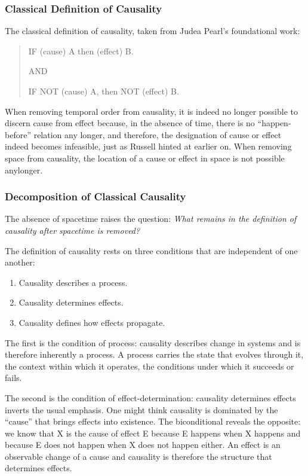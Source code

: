 \subsubsection{Classical Definition of Causality}


The classical definition of causality, taken from Judea Pearl's foundational work\cite{pearl2000causality}: 

\begin{quote}
    IF (cause) A then (effect) B.
    
    AND 
    
    IF NOT (cause) A, then NOT (effect) B.
\end{quote}

When removing temporal order from causality, it is indeed no longer possible to discern cause from effect because, in the absence of time, there is no “happen-before” relation any longer, and therefore, the designation of cause or effect indeed becomes infeasible, just as Russell hinted at earlier on. When removing space from causality, the location of a cause or effect in space is not possible anylonger. 
  
  
  
\subsubsection{Decomposition of Classical Causality}
\label{sec:epp_decomposition}


The absence of spacetime raises the question: \emph{What remains in the definition of causality after spacetime is removed?}

The definition of causality rests on three conditions that are independent of one another:

\begin{enumerate}
    \item Causality describes a process.
    \item Causality determines effects.
    \item Causality defines how effects propagate.
\end{enumerate}


 The first is the condition of process: causality describes change in systems and is therefore inherently a process. A process carries the state that evolves through it, the context within which it operates, the conditions under which it succeeds or fails.
 
 The second is the condition of effect-determination: causality determines effects inverts the usual emphasis. One might think causality is dominated by the ``cause'' that brings effects into existence. The biconditional reveals the opposite: we know that X is the cause of effect E because E happens when X happens and because E does not happen when X does not happen either. An effect is an observable change of a cause and causality is therefore the structure that determines effects.
  
